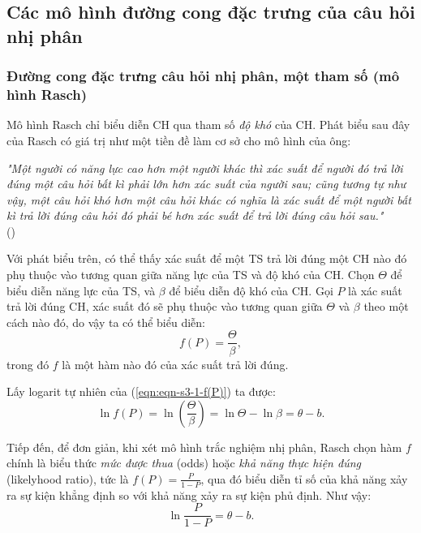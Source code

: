 \subsection{Các mô hình đường cong đặc trưng của câu hỏi nhị phân}
\subsubsection{Đường cong đặc trưng câu hỏi nhị phân, một tham số (mô hình Rasch)}
Mô hình Rasch chỉ biểu diễn CH qua tham số \textit{độ khó} của CH. Phát biểu sau đây của Rasch có giá trị như một tiền đề làm cơ sở cho mô hình của ông:\par
{\raggedleft\textit{"Một người có năng lực cao hơn một người khác thì xác suất để người đó trả lời đúng một câu hỏi bất kì phải lớn hơn xác suất của người sau; cũng tương tự như vậy, một câu hỏi khó hơn một câu hỏi khác có nghĩa là xác suất để một người bất kì trả lời đúng câu hỏi đó phải bé hơn xác suất để trả lời đúng câu hỏi sau."}\\(\cite{rasch1993probabilistic})\par}
Với phát biểu trên, có thể thấy xác suất để một TS trả lời đúng một CH nào đó phụ thuộc vào tương quan giữa năng lực của TS và độ khó của CH. Chọn $\Theta$ để biểu diễn năng lực của TS, và $\beta$ để biểu diễn độ khó của CH. Gọi $P$ là xác suất trả lời đúng CH, xác suất đó sẽ phụ thuộc vào tương quan giữa $\Theta$ và $\beta$ theo một cách nào đó, do vậy ta có thể biểu diễn:
\begin{equation}\label{eqn:eqn-s3-1-f(P)}
	f(P)=\frac{\Theta}{\beta},
\end{equation}
trong đó $f$ là một hàm nào đó của xác suất trả lời đúng.\par
Lấy logarit tự nhiên của (\ref{eqn:eqn-s3-1-f(P)}) ta được:
\begin{equation}\label{eqn:eqn-s3-2-lnf(P)}
	\ln f(P)=\ln\left(\frac{\Theta}{\beta}\right)=\ln\Theta-\ln\beta=\theta-b.
\end{equation}\par
Tiếp đến, để đơn giản, khi xét mô hình trắc nghiệm nhị phân, Rasch chọn hàm $f$ chính là biểu thức \textit{mức được thua} (odds) hoặc \textit{khả năng thực hiện đúng} (likelyhood ratio), tức là $f(P)=\frac{P}{1-P}$, qua đó biểu diễn tỉ số của khả năng xảy ra sự kiện khẳng định so với khả năng xảy ra sự kiện phủ định. Như vậy:
\begin{equation}\label{eqn:eqn-s3-3-lnP/(1-P)}
	\ln\frac{P}{1-P}=\theta-b.
\end{equation}\par
